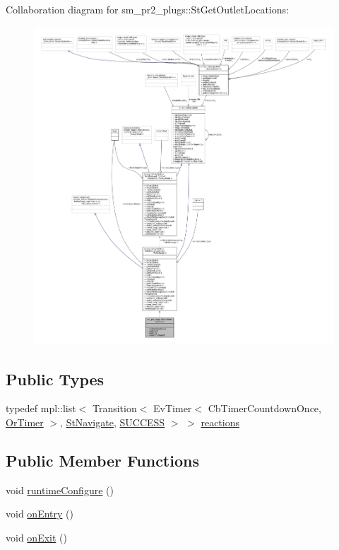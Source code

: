 Collaboration diagram for sm\+\_\+pr2\+\_\+plugs\+:\+:St\+Get\+Outlet\+Locations\+:
\nopagebreak
\begin{figure}[H]
\begin{center}
\leavevmode
\includegraphics[width=350pt]{structsm__pr2__plugs_1_1StGetOutletLocations__coll__graph}
\end{center}
\end{figure}
\subsection*{Public Types}
\begin{DoxyCompactItemize}
\item 
typedef mpl\+::list$<$ Transition$<$ Ev\+Timer$<$ Cb\+Timer\+Countdown\+Once, \hyperlink{classsm__pr2__plugs_1_1OrTimer}{Or\+Timer} $>$, \hyperlink{structsm__pr2__plugs_1_1StNavigate}{St\+Navigate}, \hyperlink{classSUCCESS}{S\+U\+C\+C\+E\+SS} $>$ $>$ \hyperlink{structsm__pr2__plugs_1_1StGetOutletLocations_ac47595196c2aa76d0c1515c7bdd55542}{reactions}
\end{DoxyCompactItemize}
\subsection*{Public Member Functions}
\begin{DoxyCompactItemize}
\item 
void \hyperlink{structsm__pr2__plugs_1_1StGetOutletLocations_ad5b299ff3f4253429690b22f3a81d9cf}{runtime\+Configure} ()
\item 
void \hyperlink{structsm__pr2__plugs_1_1StGetOutletLocations_a1327a73ab26e2a343991c05acbfb437f}{on\+Entry} ()
\item 
void \hyperlink{structsm__pr2__plugs_1_1StGetOutletLocations_a290f4741bf488758a4e22a766f2a4a5b}{on\+Exit} ()
\end{DoxyCompactItemize}
